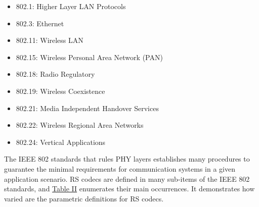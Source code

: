 \documentclass[conference]{IEEEtran}
\begin{document}
\begin{itemize}
\item 802.1: Higher Layer LAN Protocols
\item 802.3: Ethernet 
\item 802.11: Wireless LAN
\item 802.15: Wireless Personal Area Network (PAN)
\item 802.18: Radio Regulatory
\item 802.19: Wireless Coexistence
\item 802.21: Media Independent Handover Services
\item 802.22: Wireless Regional Area Networks
\item 802.24: Vertical Applications
\end{itemize}

The IEEE 802 standards that rules PHY layers establishes many procedures to guarantee the minimal requirements for communication systems in a given application scenario. RS codecs are defined in many sub-items of the IEEE 802 standards, and \hyperref[tab:t1]{Table II} enumerates their main occurrences. It demonstrates how varied are the parametric definitions for RS codecs.
\end{document}
